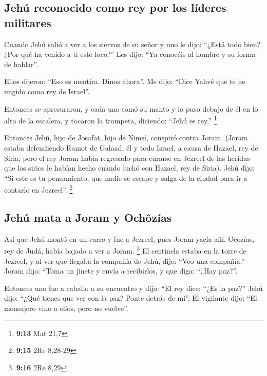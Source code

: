 \begin{paracol}{2}
\hypertarget{jehuxfa-reconocido-como-rey-por-los-luxedderes-militares}{%
\subsection{Jehú reconocido como rey por los líderes
militares}\label{jehuxfa-reconocido-como-rey-por-los-luxedderes-militares}}

 Cuando Jehú salió a ver a los siervos de su señor y uno
le dijo: ``¿Está todo bien? ¿Por qué ha venido a ti este loco?'' Les
dijo: ``Ya conocéis al hombre y su forma de hablar''.

 Ellos dijeron: ``Eso es mentira. Dinos ahora''. Me dijo:
``Dice Yahvé que te he ungido como rey de Israel''.

 Entonces se apresuraron, y cada uno tomó su manto y lo
puso debajo de él en lo alto de la escalera, y tocaron la trompeta,
diciendo: ``Jehú es rey.'' \footnote{\textbf{9:13} Mat 21,7}

 Entonces Jehú, hijo de Josafat, hijo de Nimsí, conspiró
contra Joram. (Joram estaba defendiendo Ramot de Galaad, él y todo
Israel, a causa de Hazael, rey de Siria;  pero el rey
Joram había regresado para curarse en Jezreel de las heridas que los
sirios le habían hecho cuando luchó con Hazael, rey de Siria). Jehú
dijo: ``Si este es tu pensamiento, que nadie se escape y salga de la
ciudad para ir a contarlo en Jezreel''. \footnote{\textbf{9:15} 2Re
  8,28-29}

\hypertarget{jehuxfa-mata-a-joram-y-ochuxf4zuxedas}{%
\subsection{Jehú mata a Joram y
Ochôzías}\label{jehuxfa-mata-a-joram-y-ochuxf4zuxedas}}

 Así que Jehú montó en un carro y fue a Jezreel, pues
Joram yacía allí. Ocozías, rey de Judá, había bajado a ver a Joram.
\footnote{\textbf{9:16} 2Re 8,29}  El centinela estaba en
la torre de Jezreel, y al ver que llegaba la compañía de Jehú, dijo:
``Veo una compañía.'' Joram dijo: ``Toma un jinete y envía a recibirlos,
y que diga: ``¿Hay paz?''.

 Entonces uno fue a caballo a su encuentro y dijo: ``El
rey dice: ``¿Es la paz?'' Jehú dijo: ``¿Qué tienes que ver con la paz?
Ponte detrás de mí''. El vigilante dijo: ``El mensajero vino a ellos,
pero no vuelve''.


\end{paracol}
